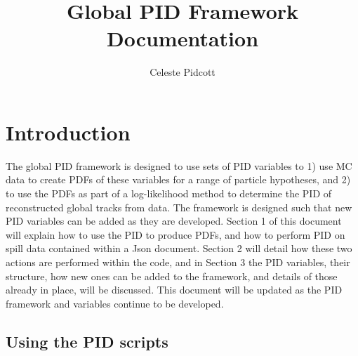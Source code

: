 \documentclass[a4paper,12pt]{article}
\begin{document}
       \title{Global PID Framework Documentation}
        \author{Celeste Pidcott}
            \date{}
    \maketitle











\section{Introduction}
\label{intro}

The global PID framework is designed to use sets of PID variables to 1) use MC data to create PDFs of these variables for a range of particle hypotheses, and 2) to use the PDFs as part of a log-likelihood method to determine the PID of reconstructed global tracks from data. The framework is designed such that new PID variables can be added as they are developed. Section 1 of this document will explain how to use the PID to produce PDFs, and how to perform PID on spill data contained within a Json document. Section 2 will detail how these two actions are performed within the code, and in Section 3 the PID variables, their structure, how new ones can be added to the framework, and details of those already in place, will be discussed. This document will be updated as the PID framework and variables continue to be developed.

\subsection{Using the PID scripts}
\label{use}
\end{document}
